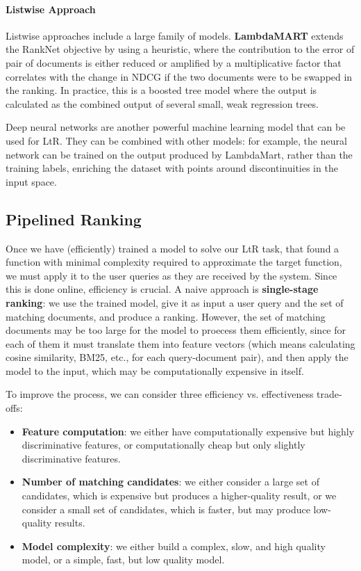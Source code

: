 \paragraph{Listwise Approach}
Listwise approaches include a large family of models. \textbf{LambdaMART} extends the RankNet objective by using a heuristic, where the contribution to the error of pair of documents is either reduced or amplified by a multiplicative factor that correlates with the change in NDCG if the two documents were to be swapped in the ranking. In practice, this is a boosted tree model where the output is calculated as the combined output of several small, weak regression trees.

Deep neural networks are another powerful machine learning model that can be used for LtR. They can be combined with other models: for example, the neural network can be trained on the output produced by LambdaMart, rather than the training labels, enriching the dataset with points around discontinuities in the input space.

\subsection{Pipelined Ranking}
Once we have (efficiently) trained a model to solve our LtR task, that found a function with minimal complexity required to approximate the target function, we must apply it to the user queries as they are received by the system. Since this is done online, efficiency is crucial. A naive approach is \textbf{single-stage ranking}: we use the trained model, give it as input a user query and the set of matching documents, and produce a ranking. However, the set of matching documents may be too large for the model to proecess them efficiently, since for each of them it must translate them into feature vectors (which means calculating cosine similarity, BM25, etc., for each query-document pair), and then apply the model to the input, which may be computationally expensive in itself.

To improve the process, we can consider three efficiency vs. effectiveness trade-offs:
\begin{itemize}
    \item \textbf{Feature computation}: we either have computationally expensive but highly discriminative features, or computationally cheap but only slightly discriminative features. 
 
    \item \textbf{Number of matching candidates}: we either consider a large set of candidates, which is expensive but produces a higher-quality result, or we consider a small set of candidates, which is faster, but may produce low-quality results. 

    \item \textbf{Model complexity}: we either build a complex, slow, and high quality model, or a simple, fast, but low quality model.
\end{itemize}

